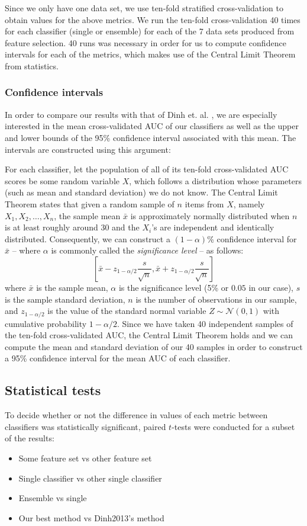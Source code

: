 Since we only have one data set, we use ten-fold stratified cross-validation
to obtain values for the above metrics. We run the ten-fold cross-validation
40 times for each classifier (single or ensemble) for each of the 7 data sets
produced from feature selection. 40 runs was necessary in order for us to
compute confidence intervals for each of the metrics, which makes use of the
Central Limit Theorem from statistics.

\subsubsection{Confidence intervals}
In order to compare our results with that of Dinh et. al. \citep{Dinh2013a},
we are especially interested in the mean cross-validated AUC of our
classifiers as well as
the upper and lower bounds of the 95\% confidence interval associated with this
mean. The intervals are constructed using this argument:

For each classifier, let the population of all of its ten-fold cross-validated
AUC scores be some random variable $X$, which follows a distribution whose
parameters (such as mean and standard deviation) we do not know.
The Central Limit Theorem states that given a random
sample of $n$ items from $X$, namely $X_1,X_2,\dots,X_n$, the sample mean
$\bar{x}$
is approximately normally distributed when $n$ is at least roughly around 30
and the $X_i$'s are independent and identically distributed.
Consequently, we can construct a $(1-\alpha)$\% confidence interval for
$\bar{x}$ -- where $\alpha$ is commonly called the
\textit{significance level} -- as follows:
\begin{equation}
  \left[\bar{x} - z_{1-\alpha/2}\dfrac{s}{\sqrt{n}},
    \bar{x} + z_{1-\alpha/2}\dfrac{s}{\sqrt{n}}\right]
\end{equation}
where $\bar{x}$ is the sample mean, $\alpha$ is the significance level
(5\% or $0.05$ in our case), $s$ is the sample standard deviation, $n$
is the number of observations in our sample, and $z_{1-\alpha/2}$ is the value
of the standard normal variable $Z \sim \mathcal{N}(0,1)$ with cumulative
probability $1-\alpha/2$. Since we have taken 40 independent samples of the
ten-fold cross-validated AUC, the Central Limit Theorem holds and we can
compute the mean and standard deviation of our 40 samples in order to
construct a 95\% confidence interval for the mean AUC of each classifier.

\subsection{Statistical tests}
To decide whether or not the difference in values of each metric between
classifiers was statistically significant, paired $t$-tests were conducted for
a subset of the results: 
\begin{itemize}
  \item Some feature set vs other feature set
  \item Single classifier vs other single classifier
  \item Ensemble vs single
  \item Our best method vs Dinh2013's method
\end{itemize}

